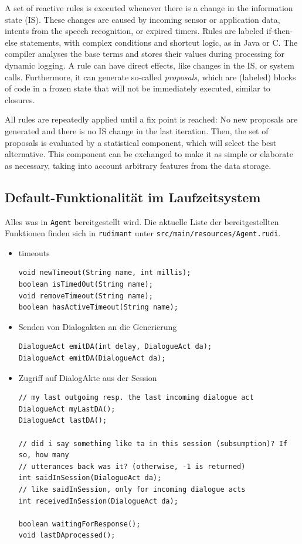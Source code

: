 A set of reactive rules is executed whenever there is a change in the
information state (IS). These changes are caused by incoming sensor or
application data, intents from the speech recognition, or expired timers.
Rules are labeled if-then-else statements, with complex conditions and shortcut
logic, as in Java or C. The compiler analyses the base terms and stores their
values during processing for dynamic logging. A rule can have direct effects,
like changes in the IS, or system calls. Furthermore, it can generate so-called
\emph{proposals}, which are (labeled) blocks of code in a frozen state that
will not be immediately executed, similar to closures.

All rules are repeatedly applied until a fix point is reached: No new proposals
are generated and there is no IS change in the last iteration. Then, the set of
proposals is evaluated by a statistical component, which will select the best
alternative. This component can be exchanged to make it as simple or elaborate
as necessary, taking into account arbitrary features from the data storage.




\subsection{Default-Funktionalität im Laufzeitsystem}
Alles was in \texttt{Agent} bereitgestellt wird. Die aktuelle Liste der
bereitgestellten Funktionen finden sich in \texttt{rudimant} unter
\texttt{src/main/resources/Agent.rudi}.

\begin{itemize}
\item timeouts
\begin{verbatim}
void newTimeout(String name, int millis);
boolean isTimedOut(String name);
void removeTimeout(String name);
boolean hasActiveTimeout(String name);
\end{verbatim}
\item Senden von Dialogakten an die Generierung
\begin{verbatim}
DialogueAct emitDA(int delay, DialogueAct da);
DialogueAct emitDA(DialogueAct da);
\end{verbatim}
\item Zugriff auf DialogAkte aus der Session
\begin{verbatim}
// my last outgoing resp. the last incoming dialogue act
DialogueAct myLastDA();
DialogueAct lastDA();

// did i say something like ta in this session (subsumption)? If so, how many
// utterances back was it? (otherwise, -1 is returned)
int saidInSession(DialogueAct da);
// like saidInSession, only for incoming dialogue acts
int receivedInSession(DialogueAct da);

boolean waitingForResponse();
void lastDAprocessed();
\end{verbatim}
\end{itemize}

